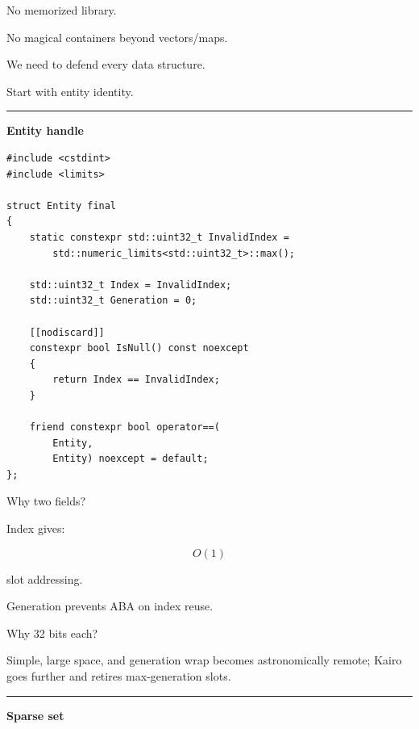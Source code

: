No memorized library.

No magical containers beyond vectors/maps.

We need to defend every data structure.

Start with entity identity.

\begin{center}\rule{0.5\linewidth}{0.5pt}\end{center}

\textbf{Entity handle}

\begin{verbatim}
#include <cstdint>
#include <limits>

struct Entity final
{
    static constexpr std::uint32_t InvalidIndex =
        std::numeric_limits<std::uint32_t>::max();

    std::uint32_t Index = InvalidIndex;
    std::uint32_t Generation = 0;

    [[nodiscard]]
    constexpr bool IsNull() const noexcept
    {
        return Index == InvalidIndex;
    }

    friend constexpr bool operator==(
        Entity,
        Entity) noexcept = default;
};
\end{verbatim}

Why two fields?

Index gives:

\[
O(1)
\]

slot addressing.

Generation prevents ABA on index reuse.

Why 32 bits each?

Simple, large space, and generation wrap becomes astronomically remote; Kairo goes further and retires max-generation slots.

\begin{center}\rule{0.5\linewidth}{0.5pt}\end{center}

\textbf{Sparse set}

